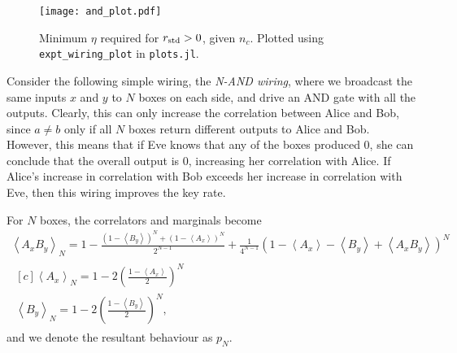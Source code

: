 \documentclass[10pt, a4paper]{article}
\numberwithin{equation}{section} %
\theoremstyle{definition}
\theoremstyle{plain}
\newcommand{\?}{\mathrel{?}} %
\newcommand{\angleb}[1]{\left\langle #1 \right\rangle} %
\newcommand{\std}{\rm std}
\begin{document}
              \begin{figure}
                \centering
                \texttt{[image: and\_plot.pdf]}
                \caption{\label{fig:exptplt} Minimum \(\eta\) required for \(r_{\std} > 0\), given \(n_c\). Plotted using \texttt{expt\_wiring\_plot} in \texttt{plots.jl}.}
              \end{figure}

              Consider the following simple wiring, the \emph{N-AND wiring}, where we broadcast the same inputs \(x\) and \(y\) to \(N\) boxes on each side, and drive an AND gate with all the outputs. Clearly, this can only increase the correlation between Alice and Bob, since \(a \neq b\) only if all \(N\) boxes return different outputs to Alice and Bob. However, this means that if Eve knows that any of the boxes produced 0, she can conclude that the overall output is 0, increasing her correlation with Alice. If Alice's increase in correlation with Bob exceeds her increase in correlation with Eve, then this wiring improves the key rate.

              For \(N\) boxes, the correlators and marginals become
              \begin{gather}
                \angleb{A_x B_y}_{N} = 1 - \frac{{(1-\angleb{B_y})}^N + {(1-\angleb{A_x})}^N}{2^{N-1}} + \frac{1}{4^{N-1}} {(1-\angleb{A_x} - \angleb{B_y} + \angleb{A_x B_y})}^{N} \\
                \begin{gathered}[c]
                  \angleb{A_x}_{N} = 1 - 2 {\left(\frac{1-\angleb{A_x}}{2}\right)}^N \\
                  \angleb{B_y}_{N} = 1 - 2 {\left(\frac{1-\angleb{B_y}}{2}\right)}^N,
                \end{gathered}
              \end{gather}
              and we denote the resultant behaviour as \(p_N\).
\end{document}
